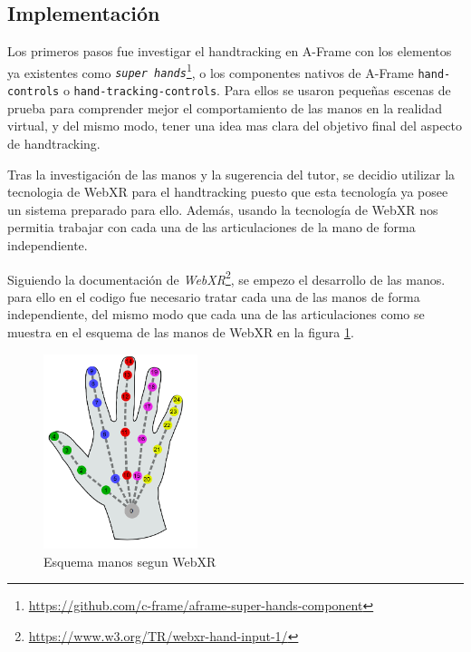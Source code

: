 \documentclass[a4paper, 12pt]{book}
\begin{document}
\subsection{Implementación}
\label{subsec:implementacion1}
Los primeros pasos fue investigar el handtracking en A-Frame con los elementos ya existentes como \textit{\texttt{super hands}}\footnote{\url{https://github.com/c-frame/aframe-super-hands-component}}, o los componentes nativos de A-Frame \texttt{hand-controls} o \texttt{hand-tracking-controls}.
Para ellos se usaron pequeñas escenas de prueba para comprender mejor el comportamiento de las manos en la realidad virtual, y del mismo modo, tener una idea mas clara del objetivo final del aspecto de handtracking. 

Tras la investigación de las manos y la sugerencia del tutor, se decidio utilizar la tecnologia de WebXR para el handtracking puesto que esta tecnología ya posee un sistema preparado para ello. Además, usando la tecnología de WebXR nos permitia trabajar con cada una de las articulaciones de la mano de forma independiente. 

Siguiendo la documentación de \textit{WebXR}\footnote{\url{https://www.w3.org/TR/webxr-hand-input-1/}}, se empezo el desarrollo de las manos. para ello en el codigo fue necesario tratar cada una de las manos de forma independiente, del mismo modo que cada una de las articulaciones como se muestra en el esquema de las manos de WebXR en la figura \ref{fig:webxr-manos}. 

\begin{figure}[H] 
  \centering
  \includegraphics[width=0.4\textwidth]{img/webxr-mano.png} 
  \caption{Esquema manos segun WebXR}
  \label{fig:webxr-manos}
\end{figure}
\end{document}
